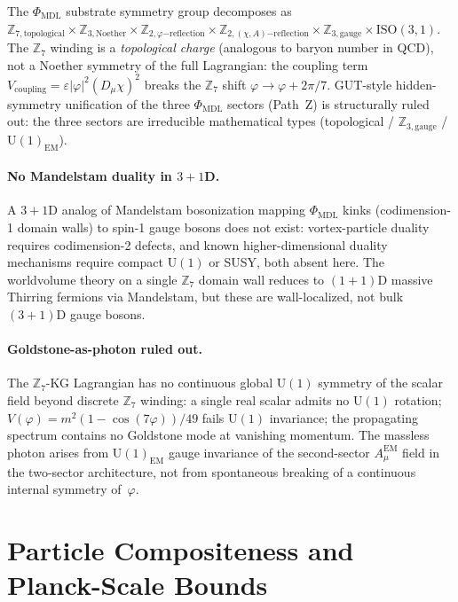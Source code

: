 \documentclass[12pt,letterpaper]{article}
\newcommand{\Zseven}{\mathbb{Z}_7}
\begin{document}
The $\Phi_{\mathrm{MDL}}$ substrate symmetry group decomposes as
$\mathbb{Z}_{7,\mathrm{topological}} \times \mathbb{Z}_{3,\mathrm{Noether}} \times
\mathbb{Z}_{2,\varphi\mathrm{-reflection}} \times \mathbb{Z}_{2,(\chi,A)\mathrm{-reflection}}
\times \mathbb{Z}_{3,\mathrm{gauge}} \times \mathrm{ISO}(3,1)$.
The $\Zseven$ winding is a \emph{topological charge} (analogous to baryon number
in QCD), not a Noether symmetry of the full Lagrangian: the coupling term
$V_{\mathrm{coupling}} = \varepsilon|\varphi|^2(D_\mu\chi)^2$ breaks the
$\Zseven$ shift $\varphi \to \varphi + 2\pi/7$.
GUT-style hidden-symmetry unification of the three $\Phi_{\mathrm{MDL}}$ sectors
(Path~Z) is structurally ruled out: the three sectors are irreducible mathematical
types (topological / $\mathbb{Z}_{3,\mathrm{gauge}}$ / $\mathrm{U}(1)_{\mathrm{EM}}$).

\paragraph{No Mandelstam duality in $3{+}1$D.}
A $3{+}1$D analog of Mandelstam bosonization mapping $\Phi_{\mathrm{MDL}}$ kinks
(codimension-1 domain walls) to spin-1 gauge bosons does not exist: vortex-particle
duality requires codimension-2 defects, and known higher-dimensional duality
mechanisms require compact $\mathrm{U}(1)$ or SUSY, both absent here.
The worldvolume theory on a single $\Zseven$ domain wall reduces to $(1{+}1)$D
massive Thirring fermions via Mandelstam, but these are wall-localized, not bulk
$(3{+}1)$D gauge bosons.

\paragraph{Goldstone-as-photon ruled out.}
The $\Zseven$-KG Lagrangian has no continuous global $\mathrm{U}(1)$ symmetry of
the scalar field beyond discrete $\Zseven$ winding: a single real scalar admits no
$\mathrm{U}(1)$ rotation; $V(\varphi) = m^2(1-\cos(7\varphi))/49$ fails
$\mathrm{U}(1)$ invariance; the propagating spectrum contains no Goldstone mode
at vanishing momentum.
The massless photon arises from $\mathrm{U}(1)_{\mathrm{EM}}$ gauge invariance of
the second-sector $A_\mu^{\mathrm{EM}}$ field in the two-sector architecture, not
from spontaneous breaking of a continuous internal symmetry of~$\varphi$.

\section{Particle Compositeness and Planck-Scale Bounds}
\label{sec:psb}
\end{document}
